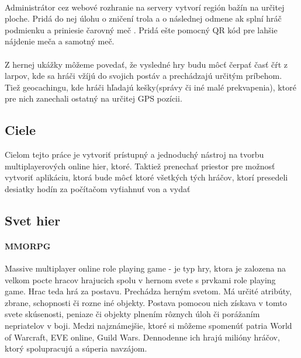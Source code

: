 \paragraph{}
Administrátor cez webové rozhranie na servery vytvorí región bažín na určitej ploche. Pridá do nej úlohu o zničení trola a o následnej odmene ak splní hráč podmienku a priniesie čarovný meč . Pridá ešte pomocný QR kód pre lahšie nájdenie meča a samotný meč.\\

\paragraph{}
Z hernej ukážky môžeme povedať, že vysledné hry budu môcť čerpať časť čŕt z larpov, kde sa hráči vžíjú do svojich postáv a prechádzajú určitým príbehom. Tiež geocachingu, kde hráči hľadajú kešky(správy či iné malé prekvapenia), ktoré pre nich zanechali ostatný na určitej GPS pozícii.


\subsection{Ciele}
Cielom tejto práce je vytvoriť prístupný a jednoduchý nástroj na tvorbu multiplayerových online hier, ktoré. Taktiež prenechať priestor pre možnosť vytvoriť aplikáciu, ktorá bude môcť  ktoré všetkých tých hráčov, ktorí presedeli desiatky hodín za počítačom vyťiahnuť von a vydať

\subsection{Svet hier}
\paragraph{MMORPG}
Massive multiplayer online role playing game - je typ hry, ktora je zalozena na velkom pocte hracov hrajucich spolu v hernom svete s prvkami role playing game. Hrac teda hrá za postavu. Prechádza herným svetom. Má určité atribúty, zbrane, schopnosti či rozne iné objekty. Postava pomocou nich získava v tomto svete skúsenosti, peniaze či objekty plnením rôznych úloh či porážaním nepriatelov v boji. 
Medzi najznámejšie, ktoré si môžeme spomenúť patria World of Warcraft, EVE online, Guild Wars. Dennodenne ich hrajú milióny hráčov, ktorý spolupracujú a súperia navzájom.


